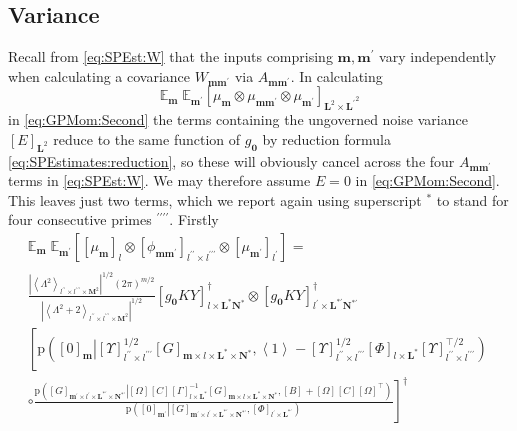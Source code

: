 \documentclass[preprint,12pt]{elsarticle}
\newcommand*{\M}[1]{\ensuremath{#1}\xspace}
\newcommand*{\x}{\times}
\newcommand*{\mi}[1]{\mathbf{#1}}
\newcommand*{\te}[2][]{\left\lbrack{#2}\right\rbrack_{#1}}
\newcommand*{\diag}[2][]{\left\langle{#2}\right\rangle_{#1}}
\newcommand*{\prob}[3]{\M{\mathrm{p}\!\left(\left.{#1}\right\vert{#2,#3}\right)}}
\newcommand*{\evt}[3][]{\mathbb{E}_{#3}^{#1}\!#2}
\newcommand*{\modulus}[1]{\M{\left\lvert{#1}\right\rvert}}
\begin{document}
    \subsection{Variance}\label{sub:GPEst:Variance}
        Recall from \cref{eq:SPEst:W} that the inputs comprising $\mi{m},\mi{m^{\prime}}$ vary independently when calculating a covariance $W_{\mi{m m^{\prime}}}$ via $A_{\mi{m m^{\prime}}}$. In calculating
        \begin{equation*}
            \evt{\;\evt{\te[\mi{L}^{2} \x \mi{L^{\prime}}^{2}]{\mu_{\mi{m}} \otimes \mu_{\mi{mm^{\prime}}} \otimes \mu_{\mi{m^{\prime}}}}}{\mi{m^{\prime}}}}{\mi{m}}
        \end{equation*}
        in \cref{eq:GPMom:Second} the terms containing the ungoverned noise variance $\te[\mi{L}^2]{E}$ reduce to the same function of $g_{\mi{0}}$ by reduction formula \cref{eq:SPEstimates:reduction}, so these will obviously cancel across the four $A_{\mi{m m^{\prime}}}$ terms in \cref{eq:SPEst:W}. 
        We may therefore assume $E=0$ in \cref{eq:GPMom:Second}. This leaves just two terms, which we report again using superscript $^{*}$ to stand for four consecutive primes $^{\prime\prime\prime\prime}$. Firstly
        \begin{multline*}
            \evt{\;\evt{\te[]{\te[l]{\mu_{\mi{m}}} \otimes \te[l^{\prime\prime}\x l^{\prime\prime\prime}]{\phi_{\mi{mm^{\prime}}}} \otimes \te[l^{\prime}]{\mu_{\mi{m^{\prime}}}}}}{\mi{m^{\prime}}}}{\mi{m}} = \\
            \frac
            {\modulus{\diag[l^{\prime\prime}\x l^{\prime\prime\prime}\x\mi{M}^{2}]{\Lambda^{2}}}^{1/2}(2\pi)^{m/2}}
            {\modulus{\diag[l^{\prime\prime}\x l^{\prime\prime\prime}\x\mi{M}^2]{\Lambda^{2}+2}}^{1/2}}
            \te[l\x\mi{L^{*}N^{*}}]{g_{\mi{0}}KY}^{\dagger} \otimes
            \te[l^{\prime}\x\mi{L^{*\prime}N^{*\prime}}]{g_{\mi{0}}KY}^{\dagger} \\
            \left\lbrack
            \prob{\te[\mi{m}]{0}}{\te[l^{\prime\prime}\x l^{\prime\prime\prime}]{\Upsilon}^{1/2} \te[\mi{m}\x l\x \mi{L^{*}\x N^{*}}]{G}} 
            {\diag[]{1} -
            \te[l^{\prime\prime}\x l^{\prime\prime\prime}]{\Upsilon}^{1/2} \te[l\x \mi{L^{*}}]{\Phi}\te[l^{\prime\prime}\x l^{\prime\prime\prime}]{\Upsilon}^{\intercal/2}} \phantom{\frac{_{\vert}^{\vert}}{_{\vert}^{\vert}}} \right.\\
            \left. \circ 
                \frac{
                    \prob{\te[\mi{m^{\prime}}\x l^{\prime}\x \mi{L^{*\prime}\x N^{*\prime}}]{G}}
                    {\te[]{\Omega} \te[]{C} \te[l\x \mi{L^{*}}]{\Gamma}^{-1} \te[\mi{m}\x l\x \mi{L^{*}\x N^{*}}]{G}}{\te[]{B}+\te[]{\Omega} \te[]{C} \te[]{\Omega}^{\intercal}}}
                    {\prob{\te[\mi{m^{\prime}}]{0}}{\te[\mi{m^{\prime}}\x l^{\prime}\x \mi{L^{*\prime}\x N^{*\prime}}]{G}}{\te[l^{\prime}\x \mi{L^{*\prime}}]{\Phi}}}
            \right\rbrack^{\dagger}
        \end{multline*}
\end{document}
